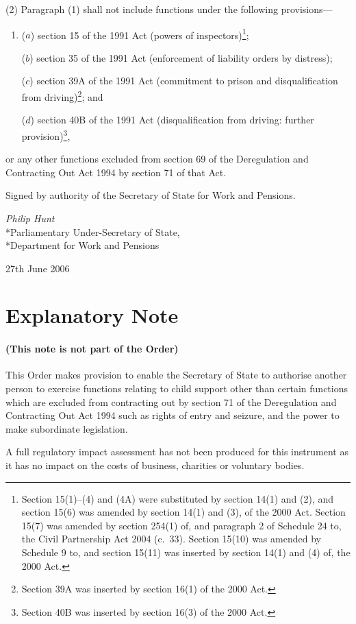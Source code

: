 \documentclass[12pt,a4paper]{article}
\begin{document}
(2) Paragraph (1) shall not include functions under the following provisions—
\begin{enumerate}\item[]
($a$) section 15 of the 1991 Act (powers of inspectors)\footnote{Section 15(1)--(4) and (4A) were substituted by section 14(1) and (2), and section 15(6) was amended by section 14(1) and (3), of the 2000 Act. Section 15(7) was amended by section 254(1) of, and paragraph 2 of Schedule 24 to, the Civil Partnership Act 2004 (c.\ 33). Section 15(10) was amended by Schedule 9 to, and section 15(11) was inserted by section 14(1) and (4) of, the 2000 Act.};

($b$) section 35 of the 1991 Act (enforcement of liability orders by distress);

($c$) section 39A of the 1991 Act (commitment to prison and disqualification from driving)\footnote{Section 39A was inserted by section 16(1) of the 2000 Act.}; and

($d$) section 40B of the 1991 Act (disqualification from driving: further provision)\footnote{Section 40B was inserted by section 16(3) of the 2000 Act.},
\end{enumerate}
or any other functions excluded from section 69 of the Deregulation and Contracting Out Act 1994 by section 71 of that Act. 

\bigskip

Signed 
by authority of the 
Secretary of State for Work and Pensions.

{\raggedleft
\emph{Philip Hunt}\\*Parliamentary Under-Secretary of State,\\*Department for Work and Pensions

}

27th June 2006

\small

\part{Explanatory Note}

\renewcommand\parthead{— Explanatory Note}

\subsection*{(This note is not part of the Order)}

This Order makes provision to enable the Secretary of State to authorise another person to exercise functions relating to child support other than certain functions which are excluded from contracting out by section 71 of the Deregulation and Contracting Out Act 1994 such as rights of entry and seizure, and the power to make subordinate legislation.

A full regulatory impact assessment has not been produced for this instrument as it has no impact on the costs of business, charities or voluntary bodies. 
\end{document}
